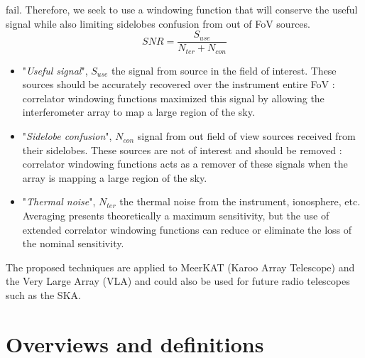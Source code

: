 \documentclass[useAMS,usenatbib]{mn2e}
\begin{document}
fail. Therefore, we seek to use a windowing function that will conserve the useful signal while also limiting sidelobes confusion from out 
of FoV sources.
\begin{equation}
 SNR=\frac{S_{use}}{N_{ter}+N_{con}}
\end{equation}
\begin{itemize}
  \item "\textit{Useful signal}", $S_{use}$ the signal from source in the field of interest. These sources should be accurately recovered
over the instrument entire FoV : correlator windowing functions maximized this signal by allowing the interferometer array to map a large 
region of the sky.
  \item "\textit{Sidelobe confusion}", $N_{con}$ signal from out field of view sources received from their  sidelobes. These sources are  
not of interest and should be removed : correlator windowing functions acts as a remover of these signals when the array is mapping a large 
region of the sky.
  \item "\textit{Thermal noise}", $N_{ter}$ the thermal noise from the instrument, ionosphere, etc. Averaging presents theoretically  a 
maximum sensitivity, but the use of extended correlator windowing functions can reduce or eliminate the loss of the nominal sensitivity.
\end{itemize}
The proposed techniques are applied to MeerKAT (Karoo Array Telescope) \cite{1} and the Very Large 
Array (VLA)\cite{1} and  could also be used for future radio telescopes such as the SKA.
\section[]{ Overviews and definitions}
\end{document}

